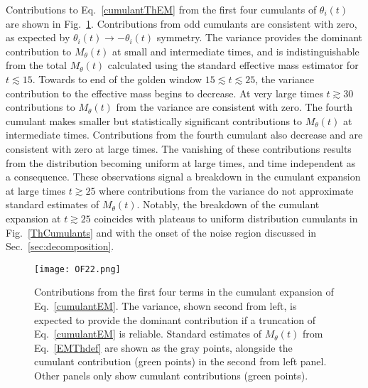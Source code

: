 Contributions to Eq.~\eqref{cumulantThEM} from the first four cumulants of $\theta_i(t)$ are shown in Fig.~\ref{ThCumulantEM}. 
Contributions from odd cumulants are consistent with zero, as expected by $\theta_i(t)\rightarrow -\theta_i(t)$ symmetry. 
The variance provides the dominant contribution to $M_\theta(t)$ at small and intermediate times, and is indistinguishable 
from the total $M_\theta(t)$ calculated using the standard effective mass estimator for $t \lesssim 15$. 
Towards to end of the golden window $15 \lesssim t \lesssim 25$, the variance contribution to the effective mass 
begins to decrease. At very large times $t \gtrsim 30$ contributions to $M_\theta(t)$ from the variance are consistent with zero. 
The fourth cumulant makes smaller but statistically significant contributions to $M_\theta(t)$ at intermediate times. 
Contributions from the fourth cumulant also decrease and are consistent with zero at large times. 
The vanishing of these contributions results from the distribution becoming uniform at large times, and time independent as a
consequence.
These observations signal a breakdown in the cumulant expansion at large times $t \gtrsim 25$ where contributions 
from the variance do not approximate standard estimates of $M_\theta(t)$. Notably, the breakdown of the cumulant 
expansion at $t\gtrsim 25$ coincides with plateaus to uniform distribution cumulants in Fig.~\ref{ThCumulants} and 
with the onset of the noise region discussed in Sec.~\ref{sec:decomposition}.
%
\begin{figure}[!ht]
  \centering
  \texttt{[image: OF22.png]}
  \caption{
  Contributions from the first four terms in  the cumulant expansion of Eq.~\eqref{cumulantEM}. 
  The variance, shown second from left, is expected to provide the dominant contribution if a truncation of 
  Eq.~\eqref{cumulantEM} is reliable. 
  Standard estimates of $M_\theta(t)$ from Eq.~\eqref{EMThdef} are shown as the gray points, alongside the cumulant contribution 
  (green points) in the second from left panel. 
  Other panels only show cumulant contributions (green points).
  }
  \label{ThCumulantEM}
\end{figure}
%


